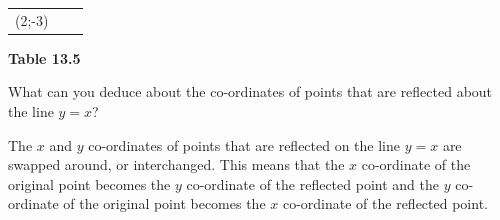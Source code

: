{\begin{center}
\begin{xtabular*}{\mytablewidth}[t]{|p{10\mystarwidth}|p{10\mystarwidth}|p{10\mystarwidth}|}
    
        (2;-3) &
    
    
     \tabularnewline{}
    \end{xtabular*}
      \end{center}
    \begin{center}{\small\bfseries Table 13.5}\end{center}
    
    \addtocounter{footnote}{-0}
    
        }%
      
    \par
  
          
          \label{m39358*id72055}What can you deduce about the co-ordinates of points that are reflected about the line $y=x$? \par 

          \label{m39358*id72080}The $x$ and \begin{math}y\end{math} co-ordinates of points that are reflected on the line \begin{math}y=x\end{math} are swapped around, or interchanged. This means that the \begin{math}x\end{math} co-ordinate of the original point becomes the \begin{math}y\end{math} co-ordinate of the reflected point and the \begin{math}y\end{math} co-ordinate of the original point becomes the \begin{math}x\end{math} co-ordinate of the reflected point.\par 
          
    \setcounter{subfigure}{0}


